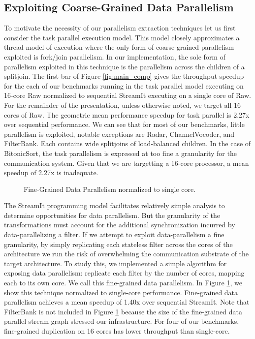 \subsection{Exploiting Coarse-Grained Data Parallelism}
To motivate the necessity of our parallelism extraction techniques let
us first consider the task parallel execution model.  This model
closely approximates a thread model of execution where the only form
of coarse-grained parallelism exploited is fork/join parallelism.  In
our implementation, the sole form of parallelism exploited in this
technique is the parallelism across the children of a splitjoin. The
first bar of Figure \ref{fig:main_comp} gives the throughput speedup
for the each of our benchmarks running in the task parallel model
executing on 16-core Raw normalized to sequential StreamIt executing
on a single core of Raw.  For the remainder of the presentation,
unless otherwise noted, we target all 16 cores of Raw.  The geometric
mean performance speedup for task parallel is 2.27x over sequential
performance. We can see that for most of our benchmarks, little
parallelism is exploited, notable exceptions are Radar,
ChannelVocoder, and FilterBank.  Each contains wide splitjoins of
load-balanced children.  In the case of BitonicSort, the task
parallelism is expressed at too fine a granularity for the
communication system.  Given that we are targetting a 16-core
processor, a mean speedup of 2.27x is inadequate.

\begin{figure}[t]
\centering
{}
\caption{Fine-Grained Data Parallelism normalized to single core.
\protect\label{fig:fine_data}}
\end{figure}
The StreamIt programming model facilitates relatively simple analysis
to determine opportunities for data parallelism.  But the granularity
of the transformations must account for the additional synchronization
incurred by data-parallelizing a filter.  If we attempt to exploit
data-parallelism a fine granularity, by simply replicating each
stateless filter across the cores of the architecture we run the risk
of overwhelming the communication substrate of the target
architecture.  To study this, we implemented a simple algorithm for
exposing data parallelism: replicate each filter by the number of
cores, mapping each to its own core.  We call this fine-grained data
parallelism. In Figure \ref{fig:fine_data}, we show this technique
normalized to single-core performance. Fine-grained data parallelism
achieves a mean speedup of 1.40x over sequential StreamIt. Note that
FilterBank is not included in Figure \ref{fig:fine_data} because the
size of the fine-grained data parallel stream graph stressed our
infrastructure. For four of our benchmarks, fine-grained duplication
on 16 cores has lower throughput than single-core.

